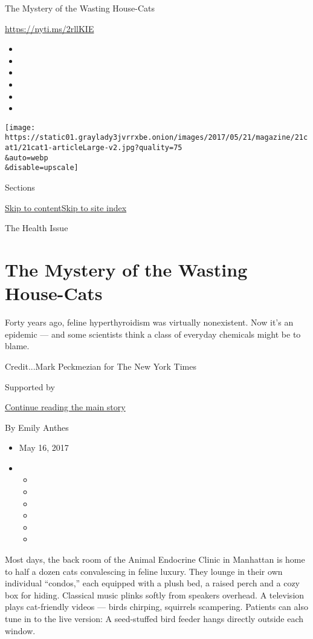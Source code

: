 The Mystery of the Wasting House-Cats

\url{https://nyti.ms/2rllKIE}

\begin{itemize}
\item
\item
\item
\item
\item
\item
\end{itemize}

\texttt{[image: https://static01.graylady3jvrrxbe.onion/images/2017/05/21/magazine/21cat1/21cat1-articleLarge-v2.jpg?quality=75\\\&auto=webp\\\&disable=upscale]}

Sections

\protect\hyperlink{site-content}{Skip to
content}\protect\hyperlink{site-index}{Skip to site index}

The Health Issue

\hypertarget{the-mystery-of-the-wasting-house-cats}{%
\section{The Mystery of the Wasting
House-Cats}\label{the-mystery-of-the-wasting-house-cats}}

Forty years ago, feline hyperthyroidism was virtually nonexistent. Now
it's an epidemic --- and some scientists think a class of everyday
chemicals might be to blame.

Credit...Mark Peckmezian for The New York Times

Supported by

\protect\hyperlink{after-sponsor}{Continue reading the main story}

By Emily Anthes

\begin{itemize}
\item
  May 16, 2017
\item
  \begin{itemize}
  \item
  \item
  \item
  \item
  \item
  \item
  \end{itemize}
\end{itemize}

Most days, the back room of the Animal Endocrine Clinic in Manhattan is
home to half a dozen cats convalescing in feline luxury. They lounge in
their own individual ``condos,'' each equipped with a plush bed, a
raised perch and a cozy box for hiding. Classical music plinks softly
from speakers overhead. A television plays cat-friendly videos --- birds
chirping, squirrels scampering. Patients can also tune in to the live
version: A seed-stuffed bird feeder hangs directly outside each window.

